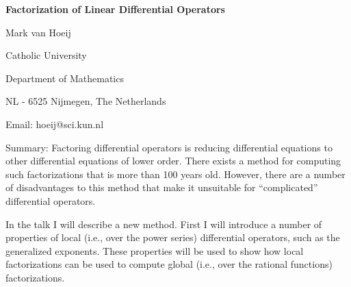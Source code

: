 

\centerline{\bf Factorization of Linear Differential Operators}

\vskip 0.3cm

\centerline{Mark van Hoeij}
\centerline{Catholic University}
\centerline{Department of Mathematics}
\centerline{NL - 6525 Nijmegen, The Netherlands}
\centerline{Email: hoeij@sci.kun.nl}

\vskip 0.3cm

Summary: Factoring differential operators is reducing differential
equations to other differential equations of lower order. There exists
a method for computing such factorizations that is more than 100 years
old. However, there are a number of disadvantages to this method that
make it unsuitable for ``complicated'' differential operators.

In the talk I will describe a new method. First I will introduce
a number of properties of local (i.e., over the power series)
differential operators, such as the generalized exponents. These
properties will be used to show how local factorizations can be
used to compute global (i.e., over the rational functions) factorizations.



